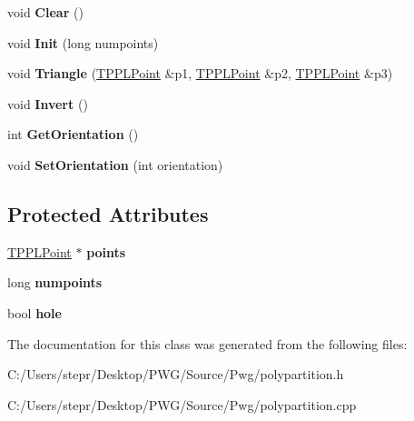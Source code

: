 \begin{DoxyCompactItemize}
\item 
\mbox{\label{class_t_p_p_l_poly_a3d1e66a335154ead6fa9a7a6a27893ee}} 
void {\bfseries Clear} ()
\item 
\mbox{\label{class_t_p_p_l_poly_a1cc04d76fe5f541fc693d33d3165c40a}} 
void {\bfseries Init} (long numpoints)
\item 
\mbox{\label{class_t_p_p_l_poly_aa441ad9ace0c1c0f8a14100cd17b5fe2}} 
void {\bfseries Triangle} (\mbox{\hyperlink{struct_t_p_p_l_point}{T\+P\+P\+L\+Point}} \&p1, \mbox{\hyperlink{struct_t_p_p_l_point}{T\+P\+P\+L\+Point}} \&p2, \mbox{\hyperlink{struct_t_p_p_l_point}{T\+P\+P\+L\+Point}} \&p3)
\item 
\mbox{\label{class_t_p_p_l_poly_a99ab53e52287392309bfb05e9a8f800d}} 
void {\bfseries Invert} ()
\item 
\mbox{\label{class_t_p_p_l_poly_a9d7b0d46320bed5720f8b64d8075af2a}} 
int {\bfseries Get\+Orientation} ()
\item 
\mbox{\label{class_t_p_p_l_poly_a16ef4df34dd0ff5e6a4d6fa8721c94a1}} 
void {\bfseries Set\+Orientation} (int orientation)
\end{DoxyCompactItemize}
\subsection*{Protected Attributes}
\begin{DoxyCompactItemize}
\item 
\mbox{\label{class_t_p_p_l_poly_accd1efbcc3616da17637ec6ab1e2741f}} 
\mbox{\hyperlink{struct_t_p_p_l_point}{T\+P\+P\+L\+Point}} $\ast$ {\bfseries points}
\item 
\mbox{\label{class_t_p_p_l_poly_acfce057d950f2e38bd7dd19bac5f31e7}} 
long {\bfseries numpoints}
\item 
\mbox{\label{class_t_p_p_l_poly_a4a8aeeabad74742070ece190050cce38}} 
bool {\bfseries hole}
\end{DoxyCompactItemize}


The documentation for this class was generated from the following files\+:\begin{DoxyCompactItemize}
\item 
C\+:/\+Users/stepr/\+Desktop/\+P\+W\+G/\+Source/\+Pwg/polypartition.\+h\item 
C\+:/\+Users/stepr/\+Desktop/\+P\+W\+G/\+Source/\+Pwg/polypartition.\+cpp\end{DoxyCompactItemize}
